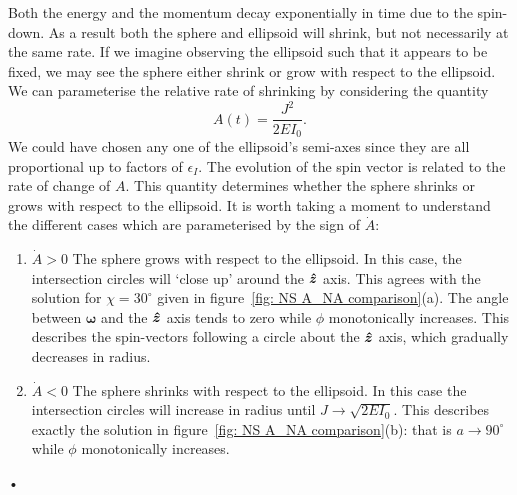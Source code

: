 \documentclass[../full_thesis/full_thesis.tex]{subfiles}
\begin{document}
Both the energy and the momentum decay exponentially in time
due to the spin-down. As a result both the sphere and ellipsoid will shrink, but
not necessarily at the same rate. If we imagine observing the ellipsoid such
that it appears to be fixed, we may see the sphere either shrink or grow with
respect to the ellipsoid. We can parameterise the relative rate of shrinking by
considering the quantity
\begin{equation}
A(t)  = \frac{J^{2}} {2EI_{0}}.
\label{eqn: A}
\end{equation}
We could have chosen any one of the ellipsoid's semi-axes since they are all
proportional up to factors of $\epsilon_{I}$. The evolution of the spin
vector is related to the rate of change of $A$.
This quantity determines whether the sphere shrinks or grows with respect to
the ellipsoid. It is worth taking a moment to understand the different cases
which are parameterised by the sign of $\dot{A}$:
\begin{enumerate}
\item $\dot{A}>0$ The sphere grows with respect to the ellipsoid. In this case,
    the intersection circles will `close up' around the $\boldsymbol{\hat{z}}$ axis. This
    agrees with the solution for $\chi=30^{\circ}$ given in
    figure~\ref{fig: NS A_NA comparison}(a). The angle between
    $\boldsymbol{\omega}$ and the $\boldsymbol{\hat{z}}$ axis tends to zero while $\phi$
    monotonically increases. This describes the spin-vectors following a circle
    about the $\boldsymbol{\hat{z}}$ axis, which gradually decreases in radius.
\item $\dot{A}<0$ The sphere shrinks with respect to the ellipsoid. In this
    case the intersection circles will increase in radius until $J\rightarrow
    \sqrt{2EI_{0}}$. This describes exactly the solution in
    figure~\ref{fig: NS A_NA comparison}(b): that is $a\rightarrow
    90^{\circ}$ while $\phi$ monotonically increases.
\end{enumerate}•
\end{document}
